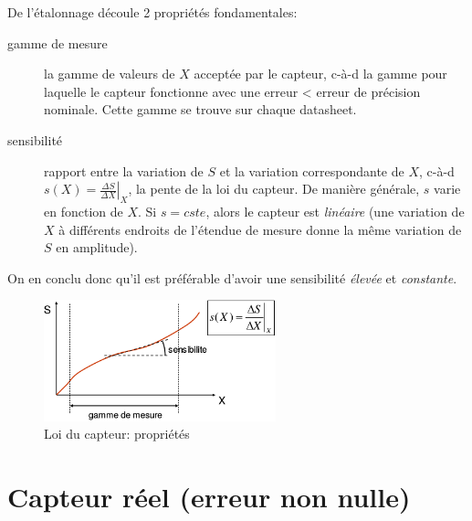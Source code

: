 De l'étalonnage découle 2 propriétés fondamentales:
\begin{description}
	\item[gamme de mesure] la gamme de valeurs de \(X\) acceptée par le capteur, c-à-d la gamme pour laquelle le capteur fonctionne avec une erreur < erreur de précision nominale. Cette gamme se trouve sur chaque datasheet.
	\item[sensibilité] rapport entre la variation de \(S\) et la variation correspondante de \(X\), c-à-d \(s(X)=\left.\frac{\Delta S}{\Delta X}\right|_X\), la pente de la loi du capteur. De manière générale, \(s\) varie en fonction de \(X\). Si \(s=cste\), alors le capteur est \emph{linéaire} (une variation de \(X\) à différents endroits de l'étendue de mesure donne la même variation de \(S\) en amplitude).
\end{description}
On en conclu donc qu'il est préférable d'avoir une sensibilité \emph{élevée} et \emph{constante}.
\begin{figure}[H] 
	\centering 
	\includegraphics[width=0.6\textwidth]{ch2/image3} 
	\caption{Loi du capteur: propriétés}
\end{figure}
\section{Capteur réel (erreur non nulle)}
